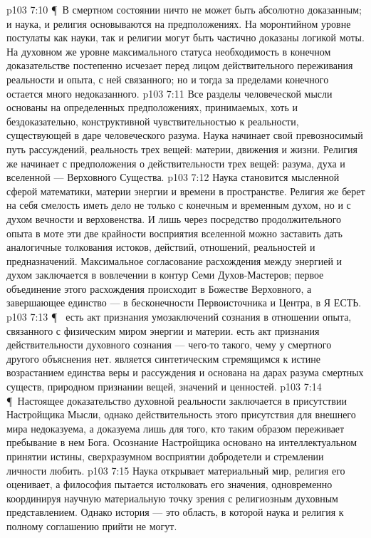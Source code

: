 \vs p103 7:10 \P\ В смертном состоянии ничто не может быть абсолютно доказанным; и наука, и религия основываются на предположениях. На моронтийном уровне постулаты как науки, так и религии могут быть частично доказаны логикой моты. На духовном же уровне максимального статуса необходимость в конечном доказательстве постепенно исчезает перед лицом действительного переживания реальности и опыта, с ней связанного; но и тогда за пределами конечного остается много недоказанного.
\vs p103 7:11 Все разделы человеческой мысли основаны на определенных предположениях, принимаемых, хоть и бездоказательно, конструктивной чувствительностью к реальности, существующей в даре человеческого разума. Наука начинает свой превозносимый путь рассуждений,  реальность трех вещей: материи, движения и жизни. Религия же начинает с предположения о действительности трех вещей: разума, духа и вселенной --- Верховного Существа.
\vs p103 7:12 Наука становится мысленной сферой математики, материи энергии и времени в пространстве. Религия же берет на себя смелость иметь дело не только с конечным и временным духом, но и с духом вечности и верховенства. И лишь через посредство продолжительного опыта в моте эти две крайности восприятия вселенной можно заставить дать аналогичные толкования истоков, действий, отношений, реальностей и предназначений. Максимальное согласование расхождения между энергией и духом заключается в вовлечении в контур Семи Духов\hyp{}Мастеров; первое объединение этого расхождения происходит в Божестве Верховного, а завершающее единство --- в бесконечности Первоисточника и Центра, в Я ЕСТЬ.
\vs p103 7:13 \P\  есть акт признания умозаключений сознания в отношении опыта, связанного с физическим миром энергии и материи.  есть акт признания действительности духовного сознания --- чего\hyp{}то такого, чему у смертного другого объяснения нет.  является синтетическим стремящимся к истине возрастанием единства веры и рассуждения и основана на дарах разума смертных существ, природном признании вещей, значений и ценностей.
\vs p103 7:14 \P\ Настоящее доказательство духовной реальности заключается в присутствии Настройщика Мысли, однако действительность этого присутствия для внешнего мира недоказуема, а доказуема лишь для того, кто таким образом переживает пребывание в нем Бога. Осознание Настройщика основано на интеллектуальном принятии истины, сверхразумном восприятии добродетели и стремлении личности любить.
\vs p103 7:15 Наука открывает материальный мир, религия его оценивает, а философия пытается истолковать его значения, одновременно координируя научную материальную точку зрения с религиозным духовным представлением. Однако история --- это область, в которой наука и религия к полному соглашению прийти не могут.
